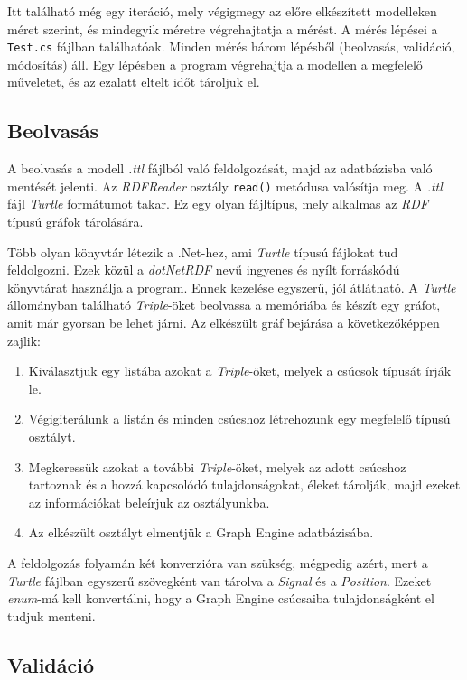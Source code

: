Itt található még egy iteráció, mely végigmegy az előre elkészített modelleken méret szerint, és mindegyik méretre végrehajtatja a mérést. A mérés lépései a \texttt{Test.cs} fájlban találhatóak. Minden mérés három lépésből (beolvasás, validáció, módosítás) áll. Egy lépésben a program végrehajtja a modellen a megfelelő műveletet, és az ezalatt eltelt időt tároljuk el.

\subsection{Beolvasás}

A beolvasás a modell \emph{.ttl} fájlból való feldolgozását, majd az adatbázisba való mentését jelenti. Az \emph{RDFReader} osztály \texttt{read()} metódusa valósítja meg. A \emph{.ttl} fájl \emph{Turtle} formátumot takar. Ez egy olyan fájltípus, mely alkalmas az \emph{RDF} típusú gráfok tárolására. 

Több olyan könyvtár létezik a .Net-hez, ami \emph{Turtle} típusú fájlokat tud feldolgozni.\cite{RDFSharp}\cite{SemWeb} Ezek közül a \emph{dotNetRDF}\cite{dotNetRDF} nevű ingyenes és nyílt forráskódú könyvtárat használja a program. Ennek kezelése egyszerű, jól átlátható. A \emph{Turtle} állományban található \emph{Triple}-öket beolvassa a memóriába és készít egy gráfot, amit már gyorsan be lehet járni. Az elkészült gráf bejárása a következőképpen zajlik:

\begin{enumerate}
	\item Kiválasztjuk egy listába azokat a \emph{Triple}-öket, melyek a csúcsok típusát írják le.
	\item Végigiterálunk a listán és minden csúcshoz létrehozunk egy megfelelő típusú osztályt.
	\item Megkeressük azokat a további \emph{Triple}-öket, melyek az adott csúcshoz tartoznak és a hozzá kapcsolódó tulajdonságokat, éleket tárolják, majd ezeket az információkat beleírjuk az osztályunkba.
	\item Az elkészült osztályt elmentjük a Graph Engine adatbázisába.
\end{enumerate}

A feldolgozás folyamán két konverzióra van szükség, mégpedig azért, mert a \emph{Turtle} fájlban egyszerű szövegként van tárolva a \emph{Signal} és a \emph{Position}. Ezeket \emph{enum}-má kell konvertálni, hogy a Graph Engine csúcsaiba tulajdonságként el tudjuk menteni.

\subsection{Validáció}

